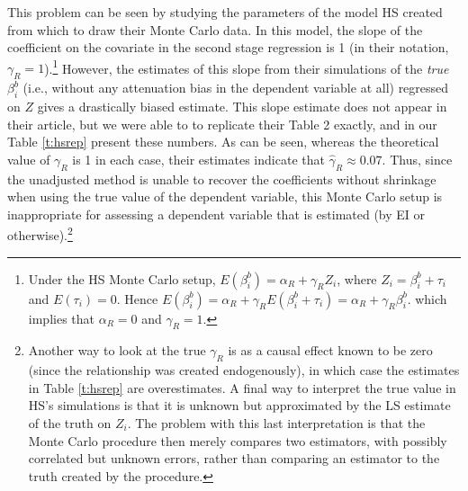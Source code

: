\documentclass[11pt,titlepage]{article}
\begin{document}
This problem can be seen by studying the parameters of the model HS
created from which to draw their Monte Carlo data.  In this model, the
slope of the coefficient on the covariate in the second stage
regression is 1 (in their notation, $\gamma_R=1$).\footnote{Under the
  HS Monte Carlo setup, $E(\beta_i^b)=\alpha_R+\gamma_R Z_i$, where
  $Z_i=\beta_i^b+\tau_i$ and $E(\tau_i)=0$.  Hence
  $E(\beta_i^b)=\alpha_R+\gamma_RE(\beta_i^b+\tau_i)=\alpha_R+\gamma_R\beta_i^b$.
  which implies that $\alpha_R=0$ and $\gamma_R=1$.}  However, the
estimates of this slope from their simulations of the \emph{true}
$\beta_i^b$ (i.e., without any attenuation bias in the dependent
variable at all) regressed on $Z$ gives a drastically biased estimate.
This slope estimate does not appear in their article, but we were able
to to replicate their Table 2 exactly, and in our Table \ref{t:hsrep}
present these numbers.  As can be seen, whereas the theoretical value
of $\gamma_R$ is 1 in each case, their estimates indicate that
$\hat\gamma_R\approx 0.07$.  Thus, since the unadjusted method is
unable to recover the coefficients without shrinkage when using the
true value of the dependent variable, this Monte Carlo setup is
inappropriate for assessing a dependent variable that is estimated (by
EI or otherwise).\footnote{Another way to look at the true $\gamma_R$
  is as a causal effect known to be zero (since the relationship was
  created endogenously), in which case the estimates in Table
  \ref{t:hsrep} are overestimates.  A final way to interpret the true
  value in HS's simulations is that it is unknown but approximated by
  the LS estimate of the truth on $Z_i$.  The problem with this last
  interpretation is that the Monte Carlo procedure then merely
  compares two estimators, with possibly correlated but unknown
  errors, rather than comparing an estimator to the truth created by
  the procedure.}
\end{document}
